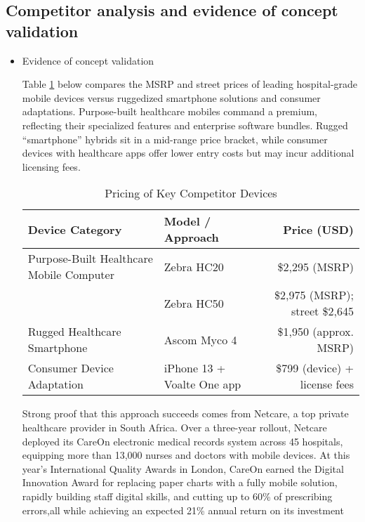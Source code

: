 \documentclass[a4paper,11pt]{article}
\begin{document}
\subsection{Competitor analysis and evidence of concept validation}
\begin{itemize} 

  \item Evidence of concept validation

Table \ref{tab:competitor-pricing} below compares the MSRP and street prices of leading hospital-grade mobile devices versus ruggedized smartphone solutions and consumer adaptations. Purpose-built healthcare mobiles command a premium, reflecting their specialized features and enterprise software bundles. Rugged “smartphone” hybrids sit in a mid-range price bracket, while consumer devices with healthcare apps offer lower entry costs but may incur additional licensing fees.

\begin{table}[H]
  \centering
  \caption{Pricing of Key Competitor Devices}
  \label{tab:competitor-pricing}
  \begin{tabularx}{\linewidth}{l l r}
    \toprule
    \textbf{Device Category}                  & \textbf{Model / Approach}      & \textbf{Price (USD)}                         \\
    \midrule
    Purpose-Built Healthcare Mobile Computer  & Zebra HC20                     & \$2,295 (MSRP)                               \\
                                              & Zebra HC50                     & \$2,975 (MSRP); street \$2,645               \\
    Rugged Healthcare Smartphone              & Ascom Myco 4                   & \$1,950 (approx. MSRP)                       \\
    Consumer Device Adaptation                & iPhone 13 + Voalte One app     & \$799 (device) + license fees                \\
    \bottomrule
  \end{tabularx}
\end{table}



Strong proof that this approach succeeds comes from Netcare, a top private healthcare provider in South Africa. Over a three-year rollout, Netcare deployed its CareOn electronic medical records system across 45 hospitals, equipping more than 13,000 nurses and doctors with mobile devices. At this year’s International Quality Awards in London, CareOn earned the Digital Innovation Award for replacing paper charts with a fully mobile solution, rapidly building staff digital skills, and cutting up to 60\% of prescribing errors,all while achieving an expected 21\% annual return on its investment\cite{News}


\end{itemize}
\end{document}
